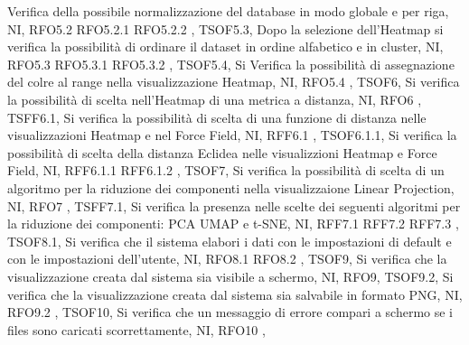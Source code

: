 {{        Verifica della possibile normalizzazione del database in modo globale e per riga,
        NI,
        RFO5.2 RFO5.2.1 RFO5.2.2
    },
    {   TSOF5.3,
        Dopo la selezione dell'Heatmap si verifica la possibilità di ordinare il dataset in ordine alfabetico e in cluster,
        NI,
        RFO5.3 RFO5.3.1 RFO5.3.2
    },
    {   TSOF5.4,
        Si Verifica la possibilità di assegnazione del colre al range nella visualizzazione Heatmap,
        NI,
        RFO5.4
    },
    {   TSOF6,
        Si verifica la possibilità di scelta nell'Heatmap di una metrica a distanza,
        NI,
        RFO6
    },
    {   TSFF6.1,
        Si verifica la possibilità di scelta di una funzione di distanza nelle visualizzazioni Heatmap e nel Force Field,
        NI,
        RFF6.1
    },
    {   TSOF6.1.1,
        Si verifica la possibilità di scelta della distanza Eclidea nelle visualizzioni Heatmap e Force Field,
        NI,
        RFF6.1.1 RFF6.1.2
    },
    {   TSOF7,
        Si verifica la possibilità di scelta di un algoritmo per la riduzione dei componenti nella visualizzaione Linear Projection,
        NI,
        RFO7
    },
    {   TSFF7.1,
        Si verifica la presenza nelle scelte dei seguenti algoritmi per la riduzione dei componenti: PCA UMAP e t-SNE,
        NI,
        RFF7.1 RFF7.2 RFF7.3
    },
    {   TSOF8.1,
        Si verifica che il sistema elabori i dati con le impostazioni di default e con le impostazioni dell'utente,
        NI,
        RFO8.1 RFO8.2
    },
    {   TSOF9,
        Si verifica che la visualizzazione creata dal sistema sia visibile a schermo,
        NI,
        RFO9},
    {   TSOF9.2,
        Si verifica che la visualizzazione creata dal sistema sia salvabile in formato PNG,
        NI,
        RFO9.2
    },
    {   TSOF10,
        Si verifica che un messaggio di errore compari a schermo se i files sono caricati scorrettamente,
        NI,
        RFO10
    },
    }
    
    

